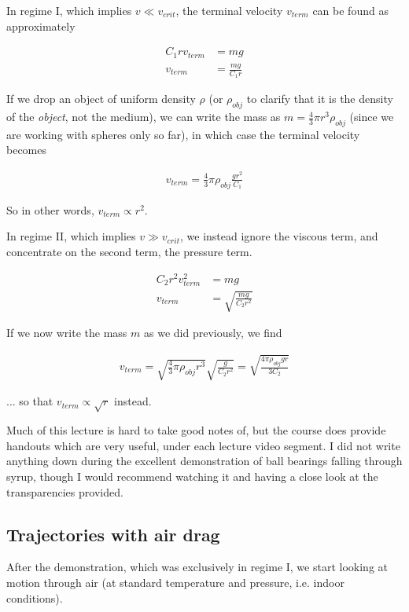In regime I, which implies $v \ll v_{crit}$, the terminal velocity $v_{term}$ can be found as approximately

\begin{align}
C_1 r v_{term} &= m g\\
v_{term} &= \frac{m g}{C_1 r}
\end{align}

If we drop an object of uniform density $\rho$ (or $\rho_{obj}$ to clarify that it is the density of the \emph{object}, not the medium), we can write the mass as $m = \frac{4}{3} \pi r^3 \rho_{obj}$ (since we are working with spheres only so far), in which case the terminal velocity becomes

\begin{align}
v_{term} = \frac{4}{3} \pi \rho_{obj} \frac{g r^2}{C_1}
\end{align}

So in other words, $v_{term} \propto r^2$.

In regime II, which implies $v \gg v_{crit}$, we instead ignore the viscous term, and concentrate on the second term, the pressure term.

\begin{align}
C_2 r^2 v_{term}^2 &= m g\\
v_{term} &= \sqrt{\frac{m g}{C_2 r^2}}
\end{align}

If we now write the mass $m$ as we did previously, we find

\begin{align}
v_{term} = \sqrt{\frac{4}{3} \pi \rho_{obj} r^3} \sqrt{\frac{ g}{C_2 r^2}} = \sqrt{\frac{4\pi \rho_{obj} g r}{3 C_2}}
\end{align}

... so that $v_{term} \propto \sqrt{r}$ instead.

Much of this lecture is hard to take good notes of, but the course does provide handouts which are very useful, under each lecture video segment. I did not write anything down during the excellent demonstration of ball bearings falling through syrup, though I would recommend watching it and having a close look at the transparencies provided.

\subsection{Trajectories with air drag}

After the demonstration, which was exclusively in regime I, we start looking at motion through air (at standard temperature and pressure, i.e. indoor conditions).

